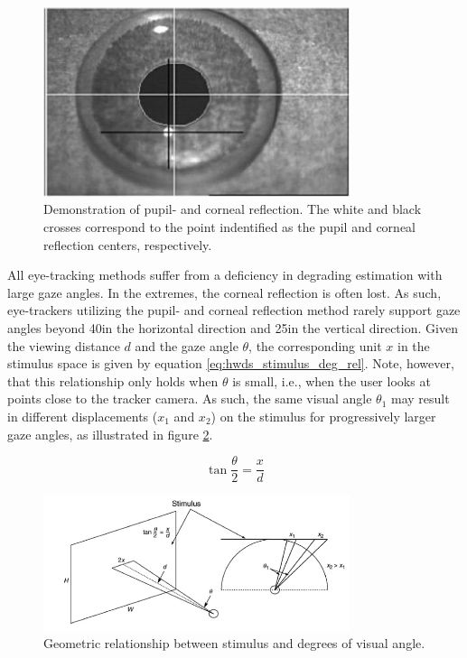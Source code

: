 \begin{figure}[h]
    \centering
    \includegraphics[width=0.8\textwidth]{Images/hwds_pupil_corneal_reflection.png}
    \caption{Demonstration of pupil- and corneal reflection. The white and black crosses correspond to the point indentified as the pupil and corneal reflection centers, respectively.}
    \label{fig:hwds_pupil_corneal_reflection}
\end{figure}

All eye-tracking methods suffer from a deficiency in degrading estimation with large gaze angles. In the extremes, the corneal reflection is often lost. As such, eye-trackers utilizing the pupil- and corneal reflection method rarely support gaze angles beyond 40\degree in the horizontal direction and 25\degree in the vertical direction. Given the viewing distance $d$ and the gaze angle $\theta$, the corresponding unit $x$ in the stimulus space is given by equation \ref{eq:hwds_stimulus_deg_rel}. Note, however, that this relationship only holds when $\theta$ is small, i.e., when the user looks at points close to the tracker camera. As such, the same visual angle $\theta_1$ may result in different displacements ($x_1$ and $x_2$) on the stimulus for progressively larger gaze angles, as illustrated in figure \ref{fig:hwds_stimulus_deg_rel}.

\begin{equation}
    \tan{\dfrac{\theta}{2}} = \dfrac{x}{d}
    \label{eq:hwds_stimulus_deg_rel}
\end{equation}

\newpage

\begin{figure}[h]
    \centering
    \includegraphics[width=0.8\textwidth]{Images/hwds_angle_stimulus_relationship.png}
    \caption{Geometric relationship between stimulus and degrees of visual angle.}
    \label{fig:hwds_stimulus_deg_rel}
\end{figure}

